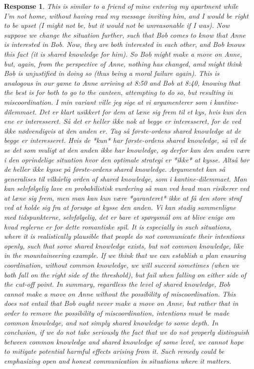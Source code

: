 \documentclass[a4paper]{article}
\newtheorem{response}{Response}
\newenvironment{tobo}{\smallskip \noindent \color{yellow!80!black!80}}{\color{black}\smallskip}
\begin{document}
\begin{response}
 This is similar to a friend of mine entering my apartment while I'm not home, without having read my message inviting him, and I would be right to be upset (I might not be, but it would not be unreasonable if  I was). Now suppose we change the situation further, such that Bob comes to know that Anne is interested in Bob. Now, they are both interested in each other, and Bob knows this fact (it is shared knowledge for him). So Bob might make a move on Anne, but, again, from the perspective of Anne, nothing has changed, amd might think Bob is unjustified in doing so (thus being a moral failure again). This is analogous in our game to Anne arriving at 8:50 and Bob at 8:40, knowing that the best is for both to go to the canteen, attempting to do so, but resulting in miscoordination.
\begin{tobo}
I min variant ville jeg sige at vi argumenterer som i kantine-dilemmaet. Det er klart usikkert for dem at læne sig frem til et kys, hvis kun den ene er interesseret. Så det er heller ikke nok at begge er interesseret, for de ved ikke nødvendigvis at den anden er. Tag så første-ordens shared knowledge at de begge er interesseret. Hvis de *kun* har første-ordens shared knowledge, så vil de se det som muligt at den anden ikke har knowledge, og derfor kan den anden være i den oprindelige situation hvor den optimale strategi er *ikke* at kysse. Altså bør de heller ikke kysse på første-ordens shared knowledge. Argumentet kan så generalises til vilkårlig orden af shared knowledge, som i kantine-dilemmaet. Man kan selvfølgelig lave en probabilistisk vurdering så man ved hvad man risikerer ved at læne sig frem, men man kan kun være *garanteret* ikke at få den store straf ved at holde sig fra at forsøge at kysse den anden. Vi kan stadig sammenligne med tidspunkterne, selvfølgelig, det er bare et spørgsmål om at blive enige om hvad reglerne er for dette romantiske spil.  
\end{tobo} 
  It is especially in such situations, where it is realistically plausible that people do not communicate their intentions openly, such that some shared knowledge exists, but not common knowledge, like in the mountaineering example. If we think that we can establish a plan ensuring coordination, without common knowledge, we will succeed sometimes (when we both fall on the right side of the threshold), but fail when falling on either side of the cut-off point. In summary, regardless the level of shared knowledge, Bob cannot make a move on Anne without the possibility of miscoordination. This does not entail that Bob ought never make a move on Anne, but rather that in order to remove the possibility of miscoordination, intentions must be made common knowledge, and not simply shared knowledge to some depth. In conclusion, if we do not take seriously the fact that we do not properly distinguish between common knowledge and shared knowledge of some level, we cannot hope to mitigate potential harmful effects arising from it. Such remedy could be emphasizing open and honest communication in situations where it matters. 


\end{response}
\end{document}
